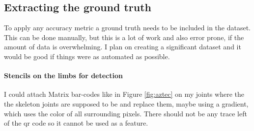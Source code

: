 \subsection{Extracting the ground truth}

To apply any accuracy metric a ground truth needs to be included in the dataset. This can be done manually, but this is a lot of work and also error prone, if the amount of data is overwhelming. I plan on creating a significant dataset and it would be good if things were as automated as possible.

\paragraph{Stencils on the limbs for detection}

I could attach Matrix bar-codes like in Figure \ref{fig:aztec} on my joints where the the skeleton joints are supposed to be and replace them, maybe using a gradient, which uses the color of all surrounding pixels. There should not be any trace left of the qr code so it cannot be used as a feature.
